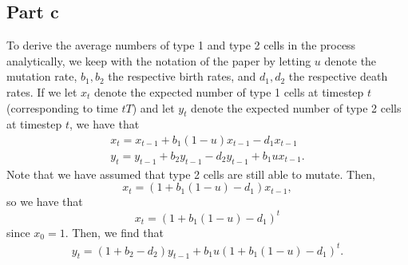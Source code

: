 \documentclass{article}
\begin{document}
\subsection{Part c}
To derive the average numbers of type 1 and type 2 cells in the process analytically, we keep with the notation of the paper by letting $u$ denote the mutation rate, $b_1,b_2$ the respective birth rates, and $d_1,d_2$ the respective death rates. If we let $x_t$ denote the expected number of type 1 cells at timestep $t$ (corresponding to time $tT$) and let $y_t$ denote the expected number of type 2 cells at timestep $t$, we have that 
\begin{align*}
x_t=x_{t-1}+b_1(1-u)x_{t-1}-d_1x_{t-1}\\
y_t=y_{t-1}+b_2y_{t-1}-d_2y_{t-1}+b_1ux_{t-1}.
\end{align*}
Note that we have assumed that type 2 cells are still able to mutate. Then, 
\[
x_t=(1+b_1(1-u)-d_1)x_{t-1},
\]
so we have that 
\[
x_t=(1+b_1(1-u)-d_1)^t
\]
since $x_0=1$. Then, we find that 
\begin{align*}
y_t=(1+b_2-d_2)y_{t-1}+b_1u(1+b_1(1-u)-d_1)^t.
\end{align*}
\end{document}
